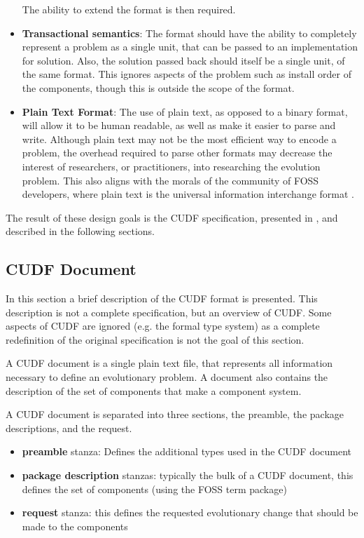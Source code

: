 \begin{itemize}
  The ability to extend the format is then required.
  \item \textbf{Transactional semantics}:
  The format should have the ability to completely represent a problem as a single unit, that can be passed to an implementation for solution.
  Also, the solution passed back should itself be a single unit, of the same format.
  This ignores aspects of the problem such as install order of the components, though this is outside the scope of the format.
  \item \textbf{Plain Text Format}:
  The use of plain text, as opposed to a binary format, will allow it to be human readable, as well as make it easier to parse and write.
  Although plain text may not be the most efficient way to encode a problem, 
  the overhead required to parse other formats may decrease the interest of researchers, or practitioners, into researching the evolution problem.
  This also aligns with the morals of the community of FOSS developers, where plain text is the universal information interchange format \citep{raymond2003art}.
\end{itemize}

The result of these design goals is the CUDF specification, presented in \citep{treinen2009common}, and described in the following sections.

\subsection{CUDF Document}
In this section a brief description of the CUDF format is presented.
This description is not a complete specification, but an overview of CUDF.
Some aspects of CUDF are ignored (e.g. the formal type system) as a complete redefinition of the original specification is not the goal of this section.

A CUDF document is a single plain text file, that represents all information necessary to define an evolutionary problem.
A document also contains the description of the set of components that make a component system.

A CUDF document is separated into three sections, the preamble, the package descriptions, and the request.

\begin{itemize}
  \item \textbf{preamble} stanza: Defines the additional types used in the CUDF document
  \item \textbf{package description} stanzas: typically the bulk of a CUDF document, this defines the set of components (using the FOSS term package)
  \item \textbf{request} stanza: this defines the requested evolutionary change that should be made to the components 
\end{itemize}

